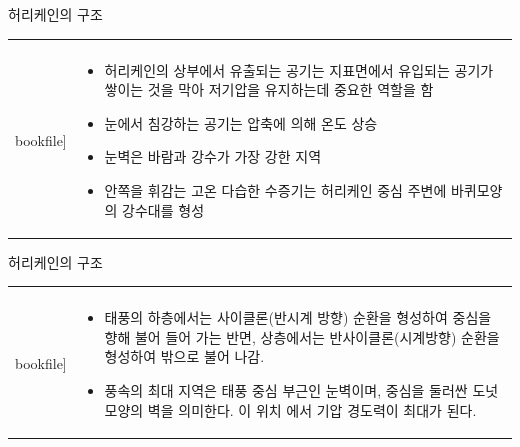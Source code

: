 \begin{frame}[t]{허리케인의 구조}
	\begin{tabular}{ll}
		\begin{minipage}[t]{0.45\textwidth}\scriptsize
			\begin{figure}[t]
				\texttt{[image: \\bookfile]}
			\end{figure}
		\end{minipage}	
		&
		\begin{minipage}[t]{0.5\textwidth} \scriptsize	

			\begin{itemize}
				\item 허리케인의 상부에서 유출되는 공기는 지표면에서 유입되는 공기가 쌓이는 것을 막아 저기압을 유지하는데 중요한 역할을 함
				\item 눈에서 침강하는 공기는 압축에 의해 온도 상승
				\item 눈벽은 바람과 강수가 가장 강한 지역
				\item 안쪽을 휘감는 고온 다습한 수증기는 허리케인 중심 주변에 바퀴모양의 강수대를 형성 
			\end{itemize}
			
		\end{minipage}
	\end{tabular}
\end{frame}



\begin{frame}[t]{허리케인의 구조}
	\begin{tabular}{ll}
		\begin{minipage}[t]{0.6\textwidth}\scriptsize
			\begin{figure}[t]
				\texttt{[image: \\bookfile]}
			\end{figure}
		\end{minipage}	
		&
		\begin{minipage}[t]{0.35\textwidth} \scriptsize	
			\begin{itemize}
				\item 태풍의 하층에서는 사이클론(반시계 방향) 순환을 형성하여 중심을 향해 불어 들어 가는 반면, 상층에서는 반사이클론(시계방향) 순환을 형성하여 밖으로 불어 나감.
				\item  풍속의 최대 지역은 태풍 중심 부근인 눈벽이며, 중심을 둘러싼 도넛 모양의 벽을 의미한다. 
				이 위치 에서 기압 경도력이 최대가 된다.
			\end{itemize}

		\end{minipage}
	\end{tabular}
\end{frame}


